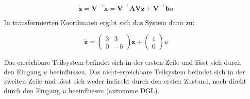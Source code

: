 \documentclass[crop=false]{standalone}
\begin{document}
\begin{task}
\begin{enumerate}[i]
\begin{solution}
 \[\dot{\mathbf{z}} = \mathbf{V}^{-1} \dot{\mathbf{x}} = \mathbf{V}^{-1} \mathbf{A} \mathbf{V} \mathbf{z} + \mathbf{V}^{-1} \mathbf{b} u
 \]
 
 In transformierten Koordinaten ergibt sich das System dann zu:
 
 \[\dot{\mathbf{z}} = \begin{pmatrix}3&3\\0&-6\end{pmatrix} \mathbf{z} + \begin{pmatrix}1\\0\end{pmatrix} u
 \]
 
 Das erreichbare Teilsystem befindet sich in der ersten Zeile und lässt sich durch den Eingang $u$ beeinflussen. Das nicht-erreichbare Teilsystem befindet sich in der zweiten Zeile und lässt sich weder indirekt durch den ersten Zustand, noch direkt durch den Eingang $u$ beeinflussen (autonome DGL).
\end{solution}
 \end{enumerate}
\end{task}
\end{document}
